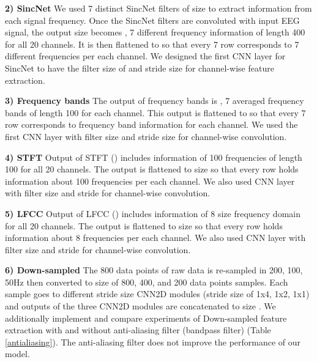 \documentclass[pmlr,twocolumn,10pt]{jmlr}
\begin{document}
\noindent\textbf{2) SincNet}
We used 7 distinct SincNet filters of size  to extract information from each signal frequency. Once the SincNet filters are convoluted with input EEG signal, the output size becomes , 7 different frequency information of length 400 for all 20 channels. It is then flattened to  so that every 7 row corresponds to 7 different frequencies per each channel. 
We designed the first CNN layer for SincNet to have the filter size of  and stride size  for channel-wise feature extraction.

\noindent\textbf{3) Frequency bands}
The output of frequency bands is , 7 averaged frequency bands of length 100 for each channel. This output is flattened to  so that every 7 row corresponds to frequency band information for each channel. We used the first CNN layer with filter size  and stride size  for channel-wise convolution.

\noindent\textbf{4) STFT}
Output of STFT () includes information of 100 frequencies of length 100 for all 20 channels. The output is flattened to size  so that every row holds information about 100 frequencies per each channel. We also used CNN layer with filter size  and stride  for channel-wise convolution.

\noindent\textbf{5) LFCC}
Output of LFCC () includes information of 8 size frequency domain for all 20 channels. The output is flattened to size  so that every row holds information about 8 frequencies per each channel. We also used CNN layer with filter size  and stride  for channel-wise convolution.

\noindent\textbf{6) Down-sampled}
The 800 data points of raw data is re-sampled in 200, 100, 50Hz then converted to size of 800, 400, and 200 data points samples. Each sample goes to different stride size CNN2D modules (stride size of 1x4, 1x2, 1x1) and outputs of the three CNN2D modules are concatenated to size . We additionally implement and compare experiments of Down-sampled feature extraction with and without anti-aliasing filter (bandpass filter) (Table \ref{antialiasing}). The anti-aliasing filter does not improve the performance of our model.
\end{document}
